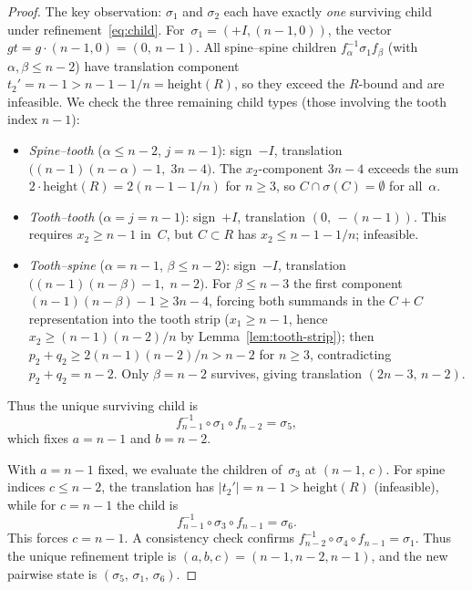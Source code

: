 \documentclass{amsart}
\theoremstyle{definition}
\theoremstyle{remark}
\begin{document}
\begin{proof}
The key observation: $\sigma_1$ and $\sigma_2$ each have exactly
\emph{one} surviving child under refinement~\eqref{eq:child}.
For~$\sigma_1 = (+I, (n{-}1, 0))$, the vector $gt = g \cdot (n{-}1, 0) =
(0,\, n{-}1)$.  All spine--spine children
$f_\alpha^{-1} \sigma_1 f_\beta$ (with $\alpha, \beta \le n{-}2$)
have translation component
$t_2' = n{-}1 > n{-}1{-}1/n = \mathrm{height}(R)$,
so they exceed the $R$-bound
and are infeasible.  We check the three remaining child types
(those involving the tooth index $n{-}1$):
\begin{itemize}
\item \emph{Spine--tooth} ($\alpha \le n{-}2$, $j = n{-}1$):
  sign~$-I$, translation $\bigl((n{-}1)(n{-}\alpha)-1,\; 3n{-}4\bigr)$.
  The $x_2$-component $3n{-}4$ exceeds the sum
  $2 \cdot \mathrm{height}(R) = 2(n{-}1{-}1/n)$ for $n \ge 3$,
  so $C \cap \sigma(C) = \emptyset$ for all~$\alpha$.
\item \emph{Tooth--tooth} ($\alpha = j = n{-}1$):
  sign~$+I$, translation $(0,\,{-}(n{-}1))$.
  This requires $x_2 \ge n{-}1$ in~$C$, but
  $C \subset R$ has $x_2 \le n{-}1{-}1/n$; infeasible.
\item \emph{Tooth--spine} ($\alpha = n{-}1$, $\beta \le n{-}2$):
  sign~$-I$, translation $\bigl((n{-}1)(n{-}\beta)-1,\; n{-}2\bigr)$.
  For $\beta \le n{-}3$ the first component
  $(n{-}1)(n{-}\beta)-1 \ge 3n{-}4$, forcing both summands in the
  $C + C$ representation into the tooth strip
  ($x_1 \ge n{-}1$, hence $x_2 \ge (n{-}1)(n{-}2)/n$
  by Lemma~\ref{lem:tooth-strip}); then
  $p_2 + q_2 \ge 2(n{-}1)(n{-}2)/n > n{-}2$ for $n \ge 3$,
  contradicting $p_2 + q_2 = n{-}2$.
  Only $\beta = n{-}2$ survives, giving translation $(2n{-}3,\,n{-}2)$.
\end{itemize}
Thus the unique surviving child is
\[
  f_{n-1}^{-1} \circ \sigma_1 \circ f_{n-2} = \sigma_5,
\]
which fixes $a = n{-}1$ and $b = n{-}2$.

With $a = n{-}1$ fixed, we evaluate the children of~$\sigma_3$
at $(n{-}1,\, c)$.  For spine indices $c \le n{-}2$, the
translation has $|t_2'| = n{-}1 > \mathrm{height}(R)$ (infeasible),
while for $c = n{-}1$ the child is
\[
  f_{n-1}^{-1} \circ \sigma_3 \circ f_{n-1} = \sigma_6.
\]
This forces $c = n{-}1$.  A consistency check confirms
$f_{n-2}^{-1} \circ \sigma_4 \circ f_{n-1} = \sigma_1$.
Thus the unique refinement triple is $(a, b, c) = (n{-}1, n{-}2,
n{-}1)$, and the new pairwise state is $(\sigma_5,\, \sigma_1,\,
\sigma_6)$.


\end{proof}
\end{document}
